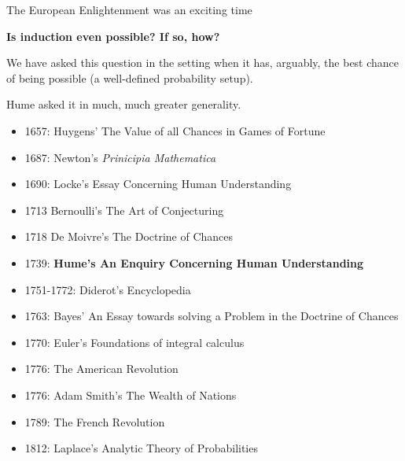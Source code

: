 \documentclass[8pt]{beamer}\usepackage[]{graphicx}\usepackage[]{color}
\begin{document}

\begin{frame}{The European Enlightenment was an exciting time}

\textbf{Is induction even possible?  If so, how?}

We have asked this question in the setting when it has, arguably, the best
chance of being possible (a well-defined probability setup).

Hume asked it in much, much greater generality.
\pause

%
\begin{minipage}{0.6 \textwidth}
%
{\footnotesize
\begin{itemize}
%
\item 1657: Huygens' The Value of all Chances in Games of Fortune
\item 1687: Newton's {\em Prinicipia Mathematica}
\item 1690: Locke's Essay Concerning Human Understanding
\item 1713 Bernoulli's The Art of Conjecturing
\item 1718 De Moivre's The Doctrine of Chances
\item 1739: \textbf{Hume's An Enquiry Concerning Human Understanding}
\item 1751-1772: Diderot's Encyclopedia
\item 1763: Bayes' An Essay towards solving a Problem in the Doctrine of Chances
\item 1770: Euler's Foundations of integral calculus
\item 1776: The American Revolution
\item 1776: Adam Smith's The Wealth of Nations
\item 1789: The French Revolution
\item 1812: Laplace's Analytic Theory of Probabilities
\vspace{1em}
%
\end{itemize}
}
%
\end{minipage}
\begin{minipage}{0.35 \textwidth}

\end{minipage}
\end{frame}
\end{document}
